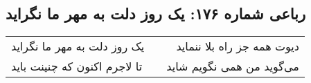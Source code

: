 \begin{center}
\section*{رباعی شماره ۱۷۶: یک روز دلت به مهر ما نگراید}
\label{sec:sh176}
\begin{longtable}{l p{0.5cm} r}
یک روز دلت به مهر ما نگراید
&&
دیوت همه جز راه بلا ننماید
\\
تا لاجرم اکنون که چنینت باید
&&
می‌گوید من همی نگویم شاید
\\
\end{longtable}
\end{center}
